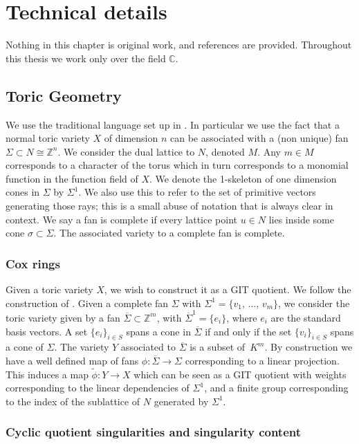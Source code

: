 \documentclass[12pt,a4paper]{book}      %
\theoremstyle{definition}
\newcommand{\mb}[1]{\mathbb{#1}}
\newcommand{\ra}{\rightarrow}
\begin{document}
\chapter{Technical details}


\setcounter{chapter}{2}
Nothing in this chapter is original work, and references are provided. Throughout this thesis we work only over the field $\mb{C}$.
\section{Toric Geometry}

We use the traditional language set up in \cite{cox}. In particular we use the fact that a normal toric variety $X$ of dimension $n$ can be associated with a (non unique) fan $\Sigma \subset N \cong \mb{Z}^n$. We consider the dual lattice to $N$, denoted $M$. Any $m \in M$ corresponds to a character of the torus which in turn corresponds to a monomial function in the function field of $X$. We denote the 1-skeleton of one dimension cones in $\Sigma$ by $\Sigma^1$. We also use this to refer to the set of primitive vectors generating those rays; this is a small abuse of notation that is always clear in context. We say a fan is complete if every lattice point $u \in N$ lies inside some cone $\sigma \subset \Sigma$. The associated variety to a complete fan is complete.
\subsection{Cox rings}
Given a toric variety $X$, we wish to construct it as a GIT quotient. We follow the construction of \cite{cox}. Given a complete fan $\Sigma$ with $\Sigma^1 = \{ v_1, \, \dots , \, v_m\}$, we consider the toric variety given by a fan $\overline{\Sigma} \subset \mb{Z}^m$, with
$\overline{\Sigma}^1 = \{e_i\}$, where $e_i$ are the standard basis vectors. A set $\{e_i\}_{i \in S}$ spans a cone in $\overline{\Sigma}$ if and only if the set $\{v_i \}_{i \in S}$ spans a cone of $\Sigma$. The variety $Y$ associated to $\overline{\Sigma}$ is a subset of~$K^m$. By construction we have a well defined map of fans $\phi \colon \overline{\Sigma} \ra \Sigma$ corresponding to a linear projection. This induces a map $\tilde{\phi} \colon Y \ra X$ which can be seen as a GIT quotient with weights corresponding to the linear dependencies of $\Sigma^1$, and a finite group corresponding to the index of the sublattice of $N$ generated by $\Sigma^1$.

\subsection{Cyclic quotient singularities and singularity content}
\end{document}
